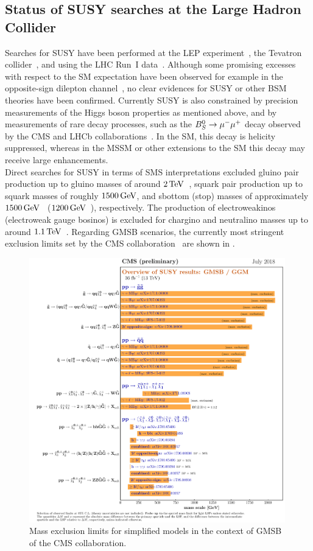 \subsection{Status of SUSY searches at the Large Hadron Collider}
Searches for SUSY have been performed  at the LEP experiment~\cite{LEP}, the Tevatron collider~\cite{TEVATRON}, and using the LHC Run~I data~\cite{ChristianRunI}. Although some promising excesses with respect to the SM expectation have been observed for example in the opposite-sign dilepton channel~\cite{Edge}, no clear evidences for SUSY or other BSM theories have been confirmed. Currently SUSY is also constrained by precision measurements of the Higgs boson properties as mentioned above, and by measurements of rare decay processes, such as the $B_S^0\to{\mu^-}{\mu^+}$ decay observed by the CMS and LHCb collaborations~\cite{B0S}. In the SM, this decay is helicity suppressed, whereas in the MSSM or other extensions to the SM this decay may receive large enhancements.\\
Direct searches for SUSY in terms of SMS interpretations excluded gluino pair production up to gluino masses of around $2\,\text{Te\hspace{-.08em}V}$~\cite{GluinoCMS}, squark pair production up to squark masses of roughly $1500\,\text{Ge\hspace{-.08em}V}$, and sbottom (stop) masses of approximately $1500\,\text{Ge\hspace{-.08em}V}$~\cite{sbottom} ($1200\,\text{Ge\hspace{-.08em}V}$~\cite{stop}), respectively. The production of electroweakinos (electroweak gauge bosinos) is excluded for chargino and neutralino masses up to around $1.1\,\text{Te\hspace{-.08em}V}$~\cite{EWKinos}.
Regarding GMSB scenarios, the currently most stringent exclusion limits set by the CMS collaboration~\cite{CMS} are shown in .
\begin{figure}[tbp]
 \centering
 \includegraphics[width=0.99\textwidth]{figures/general/barplot_GMSB}
 \caption{Mass exclusion limits for simplified models in the context of GMSB~\cite{SUSSummaryPlot} of the CMS collaboration.}
 \label{fig:GMSB_summary}
\end{figure}
